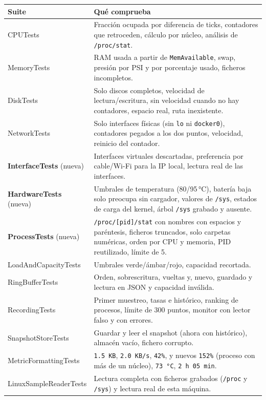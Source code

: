 \documentclass[11pt,a4paper]{article}
\begin{document}
\begin{table}[H]
\centering
\begin{tabularx}{\textwidth}{@{}lX@{}}
\toprule
\textbf{Suite} & \textbf{Qué comprueba}\\
\midrule
CPUTests & Fracción ocupada por diferencia de ticks, contadores que
retroceden, cálculo por núcleo, análisis de \texttt{/proc/stat}.\\
MemoryTests & RAM usada a partir de \texttt{MemAvailable}, swap,
presión por PSI y por porcentaje usado, ficheros incompletos.\\
DiskTests & Solo discos completos, velocidad de lectura/escritura,
sin velocidad cuando no hay contadores, espacio real, ruta
inexistente.\\
NetworkTests & Solo interfaces físicas (sin \texttt{lo} ni
\texttt{docker0}), contadores pegados a los dos puntos, velocidad,
reinicio del contador.\\
\textbf{InterfaceTests} (nueva) & Interfaces virtuales descartadas,
preferencia por cable/Wi-Fi para la IP local, lectura real de las
interfaces.\\
\textbf{HardwareTests} (nueva) & Umbrales de temperatura (80/95\,°C),
batería baja solo preocupa sin cargador, valores de \texttt{/sys},
estados de carga del kernel, árbol \texttt{/sys} grabado y ausente.\\
\textbf{ProcessTests} (nueva) & \texttt{/proc/[pid]/stat} con nombres
con espacios y paréntesis, ficheros truncados, solo carpetas
numéricas, orden por CPU y memoria, PID reutilizado, límite de 5.\\
LoadAndCapacityTests & Umbrales verde/ámbar/rojo, capacidad
recortada.\\
RingBufferTests & Orden, sobrescritura, vueltas y, nuevo, guardado y
lectura en JSON y capacidad inválida.\\
RecordingTests & Primer muestreo, tasas e histórico, ranking de
procesos, límite de 300 puntos, monitor con lector falso y con
errores.\\
SnapshotStoreTests & Guardar y leer el snapshot (ahora con
histórico), almacén vacío, fichero corrupto.\\
MetricFormattingTests & \texttt{1.5 KB}, \texttt{2.0 KB/s},
\texttt{42\%}, y nuevos \texttt{152\%} (proceso con más de un núcleo),
\texttt{73 °C}, \texttt{2 h 05 min}.\\
LinuxSampleReaderTests & Lectura completa con ficheros grabados
(\texttt{/proc} y \texttt{/sys}) y lectura real de esta máquina.\\

\end{tabularx}
\end{table}
\end{document}
